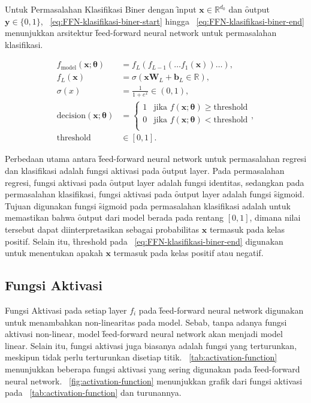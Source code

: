     Untuk Permasalahan Klasifikasi Biner dengan \f{input} $\mathbf{x}\in \mathbb{R}^{d_0}$ dan \f{output} $\mathbf{y} \in \{0, 1\}$, \equ~\ref{eq:FFN-klasifikasi-biner-start} hingga \equ~\ref{eq:FFN-klasifikasi-biner-end} menunjukkan arsitektur \f{feed-forward neural network} untuk permasalahan klasifikasi.

    \begin{align}
        \label{eq:FFN-klasifikasi-biner-start}
        f_{\text{model}}(\mathbf{x};\bm{\theta}) &= f_L(f_{L-1}(\dots f_1(\mathbf{x})) \dots), \\
        f_L(\mathbf{x}) &= \sigma(\mathbf{x} \mathbf{W}_L + \mathbf{b}_L \in \mathbb{R}), \\
        \sigma(x) &= \frac{1}{1 + e^{x}} \in (0, 1), \\
        \text{decision}(\mathbf{x};\bm{\theta}) &= \begin{cases}
        1 & \text{jika } f(\mathbf{x};\bm{\theta}) \geq \text{threshold} \\
        0 & \text{jika } f(\mathbf{x};\bm{\theta}) < \text{threshold} \\
        \end{cases}, \\
        \label{eq:FFN-klasifikasi-biner-end}
        \text{threshold}&\in [0, 1].
    \end{align}

    Perbedaan utama antara \f{feed-forward neural network} untuk permasalahan regresi dan klasifikasi adalah fungsi aktivasi pada \f{output layer}. Pada permasalahan regresi, fungsi aktivasi pada \f{output layer} adalah fungsi identitas, sedangkan pada permasalahan klasifikasi, fungsi aktivasi pada \f{output layer} adalah fungsi \f{sigmoid}. Tujuan digunakan fungsi \f{sigmoid} pada permasalahan klasifikasi adalah untuk memastikan bahwa \f{output} dari model berada pada rentang $[0, 1]$, dimana nilai tersebut dapat diinterpretasikan sebagai probabilitas $\mathbf{x}$ termasuk pada kelas positif. Selain itu, \f{threshold} pada \equ~\ref{eq:FFN-klasifikasi-biner-end} digunakan untuk menentukan apakah $\mathbf{x}$ termasuk pada kelas positif atau negatif.

    \subsection{Fungsi Aktivasi}

    Fungsi Aktivasi pada setiap \f{layer} $f_i$ pada \f{feed-forward neural network} digunakan untuk menambahkan non-linearitas pada model. Sebab, tanpa adanya fungsi aktivasi non-linear, model \f{feed-forward neural network} akan menjadi model linear. Selain itu, fungsi aktivasi juga biasanya adalah fungsi yang terturunkan, meskipun tidak perlu terturunkan disetiap titik. \tab~\ref{tab:activation-function} menunjukkan beberapa fungsi aktivasi yang sering digunakan pada \f{feed-forward neural network}. \pic~\ref{fig:activation-function} menunjukkan grafik dari fungsi aktivasi pada \tab~\ref{tab:activation-function} dan turunannya.

